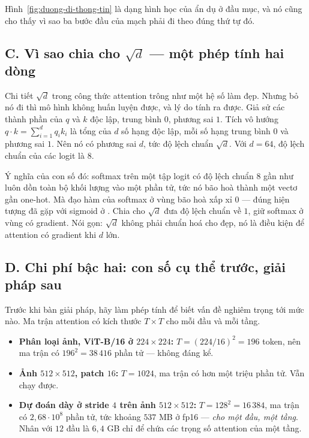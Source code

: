 \documentclass[../../../deep_learning.tex]{subfiles}
\begin{document}
Hình~\ref{fig:duong-di-thong-tin} là dạng hình học của ẩn dụ ở đầu mục, và nó cũng cho thấy vì sao ba bước đầu của mạch phải đi theo đúng thứ tự đó.

\subsection{C. Vì sao chia cho \(\sqrt{d}\) --- một phép tính hai dòng}
Chi tiết \(\sqrt{d}\) trong công thức attention trông như một hệ số làm đẹp. Nhưng bỏ nó đi thì mô hình không huấn luyện được, và lý do tính ra được. Giả sử các thành phần của \(q\) và \(k\) độc lập, trung bình \(0\), phương sai \(1\). Tích vô hướng \(q\cdot k = \sum_{i=1}^{d} q_i k_i\) là tổng của \(d\) số hạng độc lập, mỗi số hạng trung bình \(0\) và phương sai \(1\). Nên nó có phương sai \(d\), tức độ lệch chuẩn \(\sqrt{d}\). Với \(d = 64\), độ lệch chuẩn của các logit là \(8\).

Ý nghĩa của con số đó: softmax trên một tập logit có độ lệch chuẩn \(8\) gần như luôn dồn toàn bộ khối lượng vào một phần tử, tức nó bão hoà thành một vectơ gần one-hot. Mà đạo hàm của softmax ở vùng bão hoà xấp xỉ \(0\) --- đúng hiện tượng đã gặp với sigmoid ở . Chia cho \(\sqrt{d}\) đưa độ lệch chuẩn về \(1\), giữ softmax ở vùng có gradient. Nói gọn: \(\sqrt{d}\) không phải chuẩn hoá cho đẹp, nó là điều kiện để attention có gradient khi \(d\) lớn.

\subsection{D. Chi phí bậc hai: con số cụ thể trước, giải pháp sau}
Trước khi bàn giải pháp, hãy làm phép tính để biết vấn đề nghiêm trọng tới mức nào. Ma trận attention có kích thước \(T \times T\) cho mỗi đầu và mỗi tầng.

\begin{itemize}
\item \textbf{Phân loại ảnh, ViT-B/16 ở \(224\times224\):} \(T = (224/16)^2 = 196\) token, nên ma trận có \(196^2 = 38\,416\) phần tử --- không đáng kể.
\item \textbf{Ảnh \(512\times512\), patch \(16\):} \(T = 1024\), ma trận có hơn một triệu phần tử. Vẫn chạy được.
\item \textbf{Dự đoán dày ở stride \(4\) trên ảnh \(512\times512\):} \(T = 128^2 = 16\,384\), ma trận có \(2{,}68\cdot 10^{8}\) phần tử, tức khoảng \(537\) MB ở fp16 --- \emph{cho một đầu, một tầng}. Nhân với \(12\) đầu là \(6{,}4\) GB chỉ để chứa các trọng số attention của một tầng.
\end{itemize}
\end{document}
